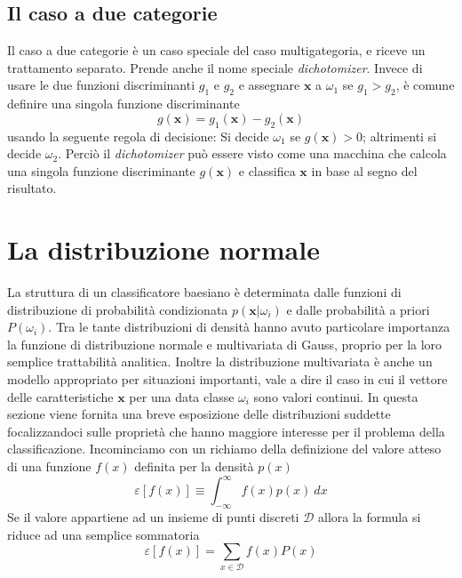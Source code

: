 \subsection{Il caso a due categorie}
Il caso a due categorie è un caso speciale del caso multigategoria, e riceve un trattamento separato. Prende anche il nome speciale \emph{dichotomizer}. Invece di usare le due funzioni discriminanti $g_1$ e $g_2$ e assegnare $\mathbf{x}$ a $\omega_1$ se $g_1 > g_2$, è comune definire una singola funzione discriminante 
\begin{equation}
g(\mathbf{x}) = g_1(\mathbf{x}) - g_2(\mathbf{x})
\end{equation}
usando la seguente regola di decisione: Si decide $\omega_1$ se $g(\mathbf{x}) > 0$; altrimenti si decide $\omega_2$. Perciò il \emph{dichotomizer} può essere visto come una macchina che calcola una singola funzione discriminante $g(\mathbf{x})$ e classifica $\mathbf{x}$ in base al segno del risultato.
\clearpage
\section{La distribuzione normale}
La struttura di un classificatore baesiano è determinata dalle funzioni di distribuzione di probabilità condizionata $p(\mathbf{x}|\omega_i)$ e dalle probabilità a priori $P(\omega_i)$. Tra le tante distribuzioni di densità hanno avuto particolare importanza la funzione di distribuzione normale e multivariata di Gauss, proprio per la loro semplice trattabilità analitica. Inoltre la distribuzione multivariata è anche un modello appropriato per situazioni importanti, vale a dire il caso in cui il vettore delle caratteristiche $\mathbf{x}$ per una data classe $\omega_i$ sono valori continui. In questa sezione viene fornita una breve esposizione delle distribuzioni suddette focalizzandoci sulle proprietà che hanno maggiore interesse per il problema della classificazione.  Incominciamo con un richiamo della definizione del valore atteso di una funzione $f(x)$ definita per la densità $p(x)$
\begin{equation}
\varepsilon [ f(x) ] \equiv \int_{-\infty}^{\infty} f(x) p(x) \ dx
\end{equation}
Se il valore appartiene ad un insieme di punti discreti $\mathcal{D}$ allora la formula si riduce ad una semplice sommatoria
\begin{equation}
\varepsilon [ f(x) ] = \sum_{x \in \mathcal{D}} f(x) P(x)
\end{equation}

